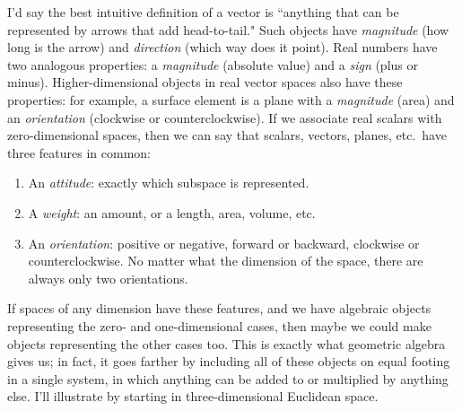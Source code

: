 \documentclass{utarticle}
\begin{document}
I'd say the best intuitive definition of a vector is ``anything that can be represented 
by arrows that add head-to-tail."  Such objects have \emph{magnitude} (how long 
is the arrow) and \emph{direction} (which way does it point).  Real numbers have 
two analogous properties: a \emph{magnitude} (absolute value) and a \emph{sign} 
(plus or minus).  Higher-dimensional objects in real vector spaces
also have these properties: for example, a surface element is a plane with a 
\emph{magnitude} (area) and an \emph{orientation} (clockwise or counterclockwise).  
If we associate real scalars with zero-dimensional spaces, then we can say that scalars, 
vectors, planes, etc.\ have three features in common:
\begin{enumerate}
\item An \emph{attitude}: exactly which subspace is represented.
\item A \emph{weight}: an amount, or a length, area, volume, etc. 
\item An \emph{orientation}: positive or negative, forward or backward, clockwise or 
          counterclockwise.  No matter what the dimension of the space, there are always 
          only two orientations.
\end{enumerate}
If spaces of any dimension have these features, and we have algebraic objects representing 
the zero- and one-dimensional cases, then maybe we could make objects representing 
the other cases too.  This is exactly what geometric algebra gives us; in fact, it goes farther 
by including all of these objects on equal footing in a single system, in which anything can be added 
to or multiplied by anything else.  I'll illustrate by starting in three-dimensional Euclidean space.
\end{document}

